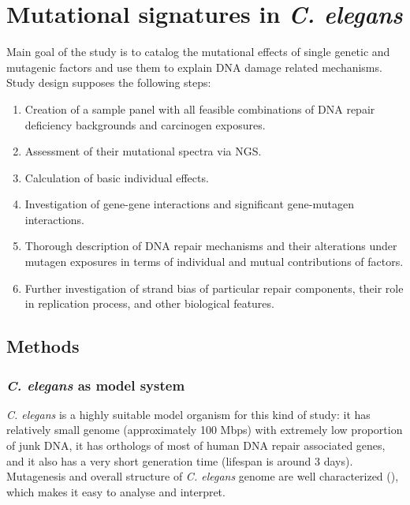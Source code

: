 

\pagestyle{empty}
\section{Mutational signatures in \textit{C. elegans}}




Main goal of the study is to catalog the mutational effects of single genetic and mutagenic factors and use them to explain DNA damage related mechanisms. Study design supposes the following steps:
\begin{enumerate}
\itemsep0em
\item Creation of a sample panel with all feasible combinations of DNA repair deficiency backgrounds and carcinogen exposures.
\item Assessment of their mutational spectra via NGS.
\item Calculation of basic individual effects.
\item Investigation of gene-gene interactions and significant gene-mutagen interactions.
\item Thorough description of DNA repair mechanisms and their alterations under mutagen exposures in terms of individual and mutual contributions of factors.
\item Further investigation of strand bias of particular repair components, their role in replication process, and other biological features.
\end{enumerate}





\subsection{Methods}

\subsubsection{\textit{C. elegans} as model system}



\textit{C. elegans} is a highly suitable model organism for this kind of study: it has relatively small genome (approximately 100 Mbps) with extremely low proportion of junk DNA, it has orthologs of most of human DNA repair associated genes, and it also has a very short generation time (lifespan is around 3 days). Mutagenesis and overall structure of \textit{C. elegans} genome are well characterized (\cite{Flibotte}), which makes it easy to analyse and interpret.


